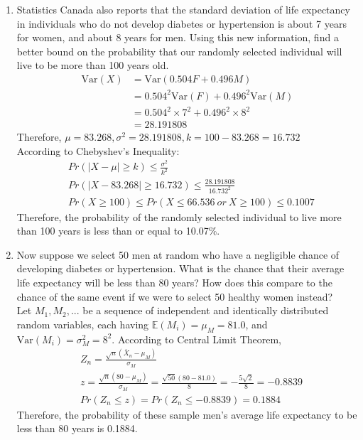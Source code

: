 \documentclass[11pt]{article}
\newcommand{\e}{\mathbb{E}}
\newcommand{\var}{\text{Var}}
\begin{document}
\begin{enumerate}[label=\textbf{Question \arabic*:},start=1]
\begin{enumerate}
  \item Statistics Canada also reports that the standard deviation of life expectancy in individuals who do not develop diabetes or hypertension is about 7 years for women, and about 8 years for men. Using this new information, find a better bound on the probability that our randomly selected individual will live to be more than 100 years old.\\
  \begin{align*}
  \var(X) & = \var(0.504F + 0.496M) \\
  & = 0.504^2 \var(F) + 0.496^2 \var(M) \\
  & = 0.504^2 \times 7^2 + 0.496^2 \times 8^2 \\
  & = 28.191808
  \end{align*}
  Therefore, $\mu = 83.268, \sigma^2 = 28.191808, k = 100 - 83.268 = 16.732$\\
  According to Chebyshev's Inequality:
  \begin{align*}
  & Pr(|X-\mu| \geq k) \leq \frac{\sigma^2}{k^2} \\ 
  & Pr(|X - 83.268| \geq 16.732) \leq \frac{28.191808}{16.732^2} \\
  & Pr(X \geq 100) \leq Pr(X \leq 66.536\ or\ X \geq 100) \leq 0.1007
  \end{align*}
  Therefore, the probability of the randomly selected individual to live more than 100 years is less than or equal to 10.07\%.\\

  \item Now suppose we select 50 men at random who have a negligible chance of developing diabetes or hypertension. What is the chance that their average life expectancy will be less than 80 years? How does this compare to the chance of the same event if we were to select 50 healthy women instead? \\
  
  Let $M_1, M_2, ... $ be a sequence of independent and identically distributed random variables, each having $\e(M_i) = \mu_M = 81.0$, and $\var(M_i) = \sigma_M^2 = 8^2$. According to Central Limit Theorem,
  \begin{align*}
  & Z_{n} = \frac{\sqrt{n}(\bar{X}_n - \mu_M)}{\sigma_M} \\
  & z = \frac{\sqrt{n}(80 - \mu_M)}{\sigma_M} = \frac{\sqrt{50} (80 - 81.0)}{8} = - \frac{5\sqrt{2}}{8} = -0.8839 \\
  & Pr(Z_n \leq z) = Pr(Z_n \leq -0.8839) = 0.1884
  \end{align*}
  Therefore, the probability of these sample men's average life expectancy to be less than 80 years is 0.1884.\\
  

\end{enumerate}
\end{enumerate}
\end{document}
